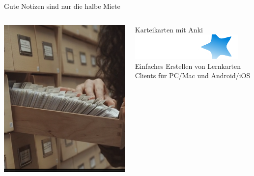 \documentclass[aspectratio=169,shownotes]{beamer}
\begin{document}
\begin{frame}{Gute Notizen sind nur die halbe Miete}
    \begin{columns}
        \begin{column}{0.4\textwidth}
            \includegraphics[width=\textwidth]{graphics/Zettelkasten.png}
        \end{column}
        \begin{column}{0.6\textwidth}   
            \begin{block}{Karteikarten mit Anki}
                \includegraphics[width=\textwidth]{graphics/Logos/anki.png}
                Einfaches Erstellen von Lernkarten
                Clients für PC/Mac und Android/iOS
                
            \end{block}                     
        \end{column}        
    \end{columns}    
\end{frame}
\end{document}
